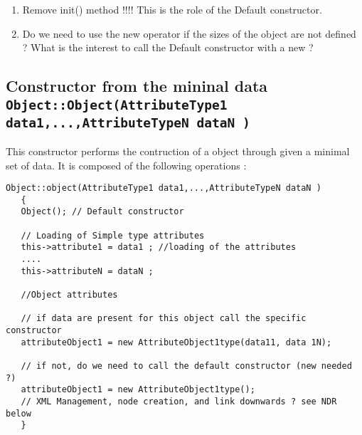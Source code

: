 \begin{ndr}
  \begin{enumerate}
  \item Remove init() method !!!! This is the role of the Default constructor.
  \item Do we need to use the new operator if the sizes of the object are not defined ? What is the interest to call the Default constructor with a new ?
  \end{enumerate}

\end{ndr}

\subsection{Constructor from the mininal data {\small \tt Object::Object(AttributeType1 data1,...,AttributeTypeN dataN ) }}

This constructor performs  the contruction of a object through given a minimal set of data.  It is composed of the following operations :

\begin{lstlisting}[frame=single,caption={Constructor from the mininal data}]
Object::object(AttributeType1 data1,...,AttributeTypeN dataN )
   {
   Object(); // Default constructor

   // Loading of Simple type attributes
   this->attribute1 = data1 ; //loading of the attributes
   ....
   this->attributeN = dataN ;

   //Object attributes

   // if data are present for this object call the specific constructor
   attributeObject1 = new AttributeObject1type(data11, data 1N);

   // if not, do we need to call the default constructor (new needed ?)
   attributeObject1 = new AttributeObject1type();
   // XML Management, node creation, and link downwards ? see NDR below
   }
\end{lstlisting} 

